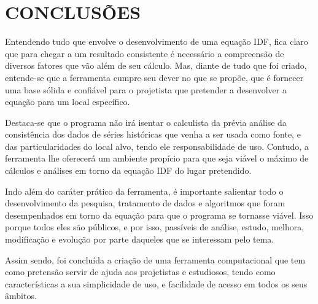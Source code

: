 \chapter{CONCLUSÕES}

Entendendo tudo que envolve o desenvolvimento de uma equação IDF, fica claro que para chegar a um resultado consistente é necessário a compreensão de diversos fatores que vão além de seu cálculo. Mas, diante de tudo que foi criado, entende-se que a ferramenta cumpre seu dever no que se propõe, que é fornecer uma base sólida e confiável para o projetista que pretender a desenvolver a equação para um local específico. 

Destaca-se que o programa não irá isentar o calculista da prévia análise da consistência dos dados de séries históricas que venha a ser usada como fonte, e das particularidades do local alvo, tendo ele responsabilidade de uso. Contudo, a ferramenta lhe oferecerá um ambiente propício para que seja viável o máximo de cálculos e análises em torno da equação IDF do lugar pretendido.

Indo além do caráter prático da ferramenta, é importante salientar todo o desenvolvimento da pesquisa, tratamento de dados e algoritmos que foram desempenhados em torno da equação para que o programa se tornasse viável. Isso porque todos eles são públicos, e por isso, passíveis de análise, estudo, melhora, modificação e evolução por parte daqueles que se interessam pelo tema.

Assim sendo, foi concluída a criação de uma ferramenta computacional que tem como pretensão servir de ajuda aos projetistas e estudiosos, tendo como características a sua simplicidade de uso, e facilidade de acesso em todos os seus âmbitos.